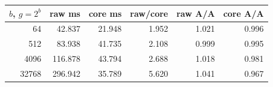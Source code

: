 \begin{center}\small
\begin{tabular}{@{}rrrrrr@{}}
\toprule
$b$, $g=2^b$ & raw ms & core ms & raw/core & raw A/A & core A/A \\
\midrule
64 & 42.837 & 21.948 & 1.952 & 1.021 & 0.996 \\
512 & 83.938 & 41.735 & 2.108 & 0.999 & 0.995 \\
4096 & 116.878 & 43.794 & 2.688 & 1.018 & 0.981 \\
32768 & 296.942 & 35.789 & 5.620 & 1.041 & 0.967 \\
\bottomrule
\end{tabular}
\end{center}
